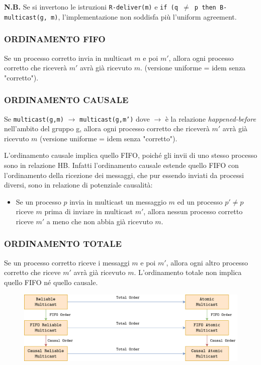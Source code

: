 \noindent\textbf{N.B.} Se si invertono le istruzioni \texttt{R-deliver(m)} e \texttt{if (q $\neq$ p then B-multicast(g, m)}, l'implementazione non soddisfa più l'uniform agreement.

 \subsubsection{ORDINAMENTO FIFO}
Se un processo corretto invia in multicast $m$ e poi $m'$, allora ogni processo corretto che riceverà $m'$ avrà già ricevuto $m$. (versione uniforme = idem senza "corretto").
\subsubsection{ORDINAMENTO CAUSALE}
Se \texttt{multicast(g,m)} $\rightarrow$ \texttt{multicast(g,m')} dove $\rightarrow$ è la relazione \textit{happened-before} nell'ambito del gruppo g, allora ogni processo corretto che riceverà $m'$ avrà già ricevuto $m$ (versione uniforme = idem senza "corretto").

L'ordinamento causale implica quello FIFO, poiché gli invii di uno stesso processo sono in relazione HB. Infatti l'ordinamento causale estende quello FIFO con l'ordinamento della ricezione dei messaggi, che pur essendo inviati da processi diversi, sono in relazione di potenziale causalità:
\begin{itemize}
    \item Se un processo $p$ invia in multicast un messaggio $m$ ed un processo $p' \neq p$ riceve $m$ prima di inviare in multicast $m'$, allora nessun processo corretto riceve $m'$ a meno che non abbia già ricevuto $m$.
\end{itemize}
\subsubsection{ORDINAMENTO TOTALE}
Se un processo corretto riceve i messaggi $m$ e poi $m'$, allora ogni altro processo corretto che riceve $m'$ avrà già ricevuto $m$. L'ordinamento totale non implica quello FIFO né quello causale.

\begin{figure}[ht]
    \centering
    \includegraphics[width=12cm]{./Images/cap2/2.18.png}
\end{figure}

